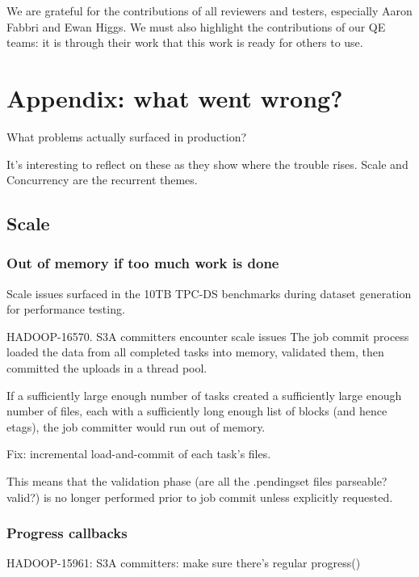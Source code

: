 \documentclass[format=acmsmall, screen=true, nonacm, timestamp, review=false]{acmart}
\begin{document}
We are grateful for the contributions of all reviewers and testers, especially
Aaron Fabbri and Ewan Higgs.
We must also highlight the contributions of our QE teams: it is through
their work that this work is ready for others to use.



\section{Appendix: what went wrong?}
\label{sec:appendix}


What problems actually surfaced in production?

It's interesting to reflect on these as they show where
the trouble rises.
Scale and Concurrency are the recurrent themes.

\subsection{Scale}
\label{subsec:scale}

\subsubsection{Out of memory if too much work is done}

Scale issues surfaced in the 10TB TPC-DS benchmarks during dataset generation
for performance testing.

HADOOP-16570. S3A committers encounter scale issues
The job commit process loaded the data from all completed tasks into memory,
validated them, then committed the uploads in a thread pool.

If a sufficiently large enough number of tasks created a sufficiently large
enough number of files, each with a sufficiently long enough list of blocks
(and hence etags), the job committer would run out of memory.

Fix: incremental load-and-commit of each task's files.

This means that the validation phase
(are all the .pendingset files parseable? valid?) is no longer performed
prior to job commit unless explicitly requested.

\subsubsection{Progress callbacks}

HADOOP-15961: S3A committers: make sure there's regular progress()
\end{document}
